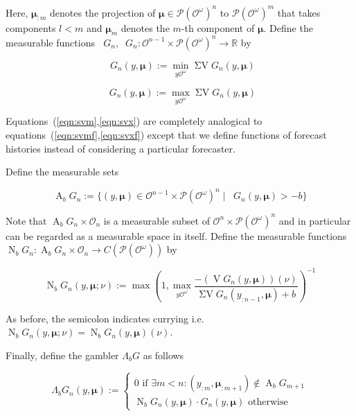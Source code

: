 \documentclass[11pt]{article}
\theoremstyle{definition}
\theoremstyle{plain}
\newcommand{\Reals}{\mathbb{R}}
\newcommand{\PM}{\mathcal{P}}
\newcommand{\Ob}{\mathcal{O}}
\newcommand{\OO}{\Ob^\omega}
\newcommand{\PMO}{\PM(\OO)}
\DeclareMathOperator{\V}{V}
\DeclareMathOperator{\SV}{\Sigma V}
\DeclareMathOperator{\SVM}{\Sigma V_{\min}}
\DeclareMathOperator{\SVX}{\Sigma V_{\max}}
\DeclareMathOperator{\Ab}{A}
\DeclareMathOperator{\Nr}{N}
\newcommand{\Bd}{\Lambda}
\newcommand{\BM}{\bm{\mu}}
\begin{document}
Here, $\BM_{:m}$ denotes the projection of $\BM \in \PMO^n$ to $\PMO^m$ that takes components $l < m$ and $\BM_m$ denotes the $m$-th component of $\BM$. Define the measurable functions $\SVM G_n, \SVX G_n: \Ob^{n-1} \times \PMO^n  \rightarrow \Reals$ by

\begin{equation}
\label{eqn:svm}
\SVM G_n\left(y,\BM\right) := \min_{y\OO}{\SV G_n\left(y,\BM\right)}
\end{equation}

\begin{equation}
\label{eqn:svx}
\SVX G_n\left(y,\BM\right) := \max_{y\OO}{\SV G_n\left(y,\BM\right)}
\end{equation}

Equations~(\ref{eqn:svm},\ref{eqn:svx}) are completely analogical to equations~(\ref{eqn:svmf},\ref{eqn:svxf}) except that we define functions of forecast histories instead of considering a particular forecaster.

Define the measurable sets

\begin{equation}
\Ab_b G_n:=\{\left(y,\BM\right) \in \Ob^{n-1} \times \PMO^n \mid \SVM G_n\left(y,\BM\right) > -b\}
\end{equation}

Note that $\Ab_b G_n \times \Ob_n$ is a measurable subset of $\Ob^n \times \PMO^n$ and in particular can be regarded as a measurable space in itself. Define the measurable functions $\Nr_b G_n: \Ab_b G_n \times \Ob_n \rightarrow C\left(\PMO\right)$ by

\begin{equation}
\Nr_b G_n\left(y,\BM;\nu\right):=\max\left(1,\max_{y\OO} \frac{-\left(\V G_n\left(y,\BM\right)\right)\left(\nu\right)}{\SV G_n\left(y_{:n-1},\BM\right)+b}\right)^{-1}
\end{equation}

As before, the semicolon indicates currying i.e. $\Nr_b G_n\left(y,\BM;\nu\right)=\Nr_b G_n\left(y,\BM\right)(\nu)$.

Finally, define the gambler $\Bd_b G$ as follows

\begin{equation}
\Bd_b G_n\left(y,\BM\right):=\begin{cases} 0 \text{ if } \exists m < n: \left(y_{:m},\BM_{:m+1}\right) \not\in \Ab_b G_{m+1} \\ \Nr_b G_n\left(y,\BM\right) \cdot G_n\left(y, \BM\right) \text{ otherwise} \end{cases}
\end{equation}
\end{document}

